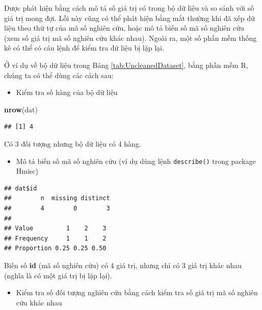 \documentclass[]{tufte-book}
\newenvironment{Shaded}{}{}
\newcommand{\KeywordTok}[1]{\textcolor[rgb]{0.00,0.44,0.13}{\textbf{#1}}}
\newcommand{\NormalTok}[1]{#1}
\newcommand{\OperatorTok}[1]{\textcolor[rgb]{0.40,0.40,0.40}{#1}}
\providecommand{\tightlist}{%
  \setlength{\itemsep}{0pt}\setlength{\parskip}{0pt}}
\begin{document}
Được phát hiện bằng cách mô tả số giá trị có trong bộ dữ liệu và so sánh với số giá trị mong đợi. Lỗi này cũng có thể phát hiện bằng mắt thường khi đã xếp dữ liệu theo thứ tự của mã số nghiên cứu, hoặc mô tả biến số mã số nghiên cứu (xem số giá trị mã số nghiên cứu khác nhau). Ngoài ra, một số phần mềm thống kê có thể có câu lệnh để kiểm tra dữ liệu bị lặp lại.

Ở ví dụ về bộ dữ liệu trong Bảng \ref{tab:UncleanedDataset}, bằng phần mềm R, chúng ta có thể dùng các cách sau:

\begin{itemize}
\tightlist
\item
  Kiểm tra số hàng của bộ dữ liệu
\end{itemize}

\begin{Shaded}
\begin{Highlighting}[]
\KeywordTok{nrow}\NormalTok{(dat)}
\end{Highlighting}
\end{Shaded}

\begin{verbatim}
## [1] 4
\end{verbatim}

Có 3 đối tượng nhưng bộ dữ liệu có 4 hàng.

\begin{itemize}
\tightlist
\item
  Mô tả biến số mã số nghiên cứu (ví dụ dùng lệnh \texttt{describe()} trong package Hmisc)
\end{itemize}

\begin{Shaded}
\end{Shaded}

\begin{verbatim}
## dat$id 
##        n  missing distinct 
##        4        0        3 
##                          
## Value         1    2    3
## Frequency     1    1    2
## Proportion 0.25 0.25 0.50
\end{verbatim}

Biến số \textbf{id} (mã số nghiên cứu) có 4 giá trị, nhưng chỉ có 3 giá trị khác nhau (nghĩa là có một giá trị bị lặp lại).

\begin{itemize}
\tightlist
\item
  Kiểm tra số đối tượng nghiên cứu bằng cách kiểm tra số giá trị mã số nghiên cứu khác nhau
\end{itemize}
\end{document}
